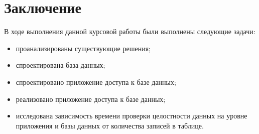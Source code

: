 \chapter*{Заключение}

В ходе выполнения данной курсовой работы были выполнены следующие задачи:
\begin{itemize}
    \item проанализированы существующие решения;
    \item спроектирована база данных;
    \item спроектировано приложение доступа к базе данных;
    \item реализовано приложение доступа к базе данных;
    \item исследована зависимость времени проверки целостности данных на уровне приложения и базы данных от количества записей в таблице.
\end{itemize}
